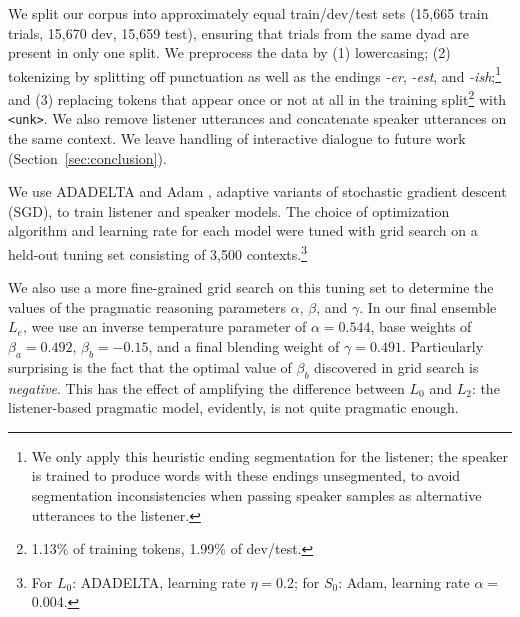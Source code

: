 \documentclass[11pt,letterpaper]{article}
\newcommand{\word}{\textit}
\newcommand{\Listener}{L}
\newcommand{\Speaker}{S}
\renewcommand{\|}{\mid}
\newcommand{\secref}[1]{Section~\ref{#1}}
\newcommand{\todocheck}[1]{\textcolor{red}{#1}}
\begin{document}
We split our corpus into approximately equal train/dev/test sets
(15,665 train trials, 15,670 dev, 15,659 test), ensuring that trials from
the same dyad are present in only one split. 
We preprocess the data by (1) lowercasing; (2) tokenizing
by splitting off punctuation as well as the endings \word{\mbox{-er}}, \word{\mbox{-est}}, and
\word{\mbox{-ish}};\footnote{We
only apply this heuristic ending segmentation for the listener; the speaker is trained to produce
words with these endings unsegmented, to avoid segmentation inconsistencies
when passing speaker samples as alternative utterances to the listener.} and
(3) replacing tokens that appear once or not at all
in the training split\footnote{1.13\% of training tokens, 1.99\% of dev/test.} with \texttt{<unk>}. We also remove
listener utterances and concatenate speaker utterances on the same context. 
We leave handling of interactive dialogue to future work (\secref{sec:conclusion}).

We use ADADELTA
\cite{Zeiler2012} and Adam \cite{Kingma2014}, adaptive variants of
stochastic gradient descent (SGD), to train listener and speaker models.
The choice of optimization
algorithm and learning rate for each model were tuned with grid search
on a held-out tuning set consisting of 3,500 contexts.\footnote{For
  $\Listener_0$: ADADELTA, learning rate $\eta = {}$0.2; for
  $\Speaker_0$: Adam, learning rate $\alpha = {}$0.004.}

We also use a more fine-grained grid search on this tuning set to determine the
values of the pragmatic reasoning parameters $\alpha$, $\beta$, and $\gamma$.
In our final ensemble $\Listener_e$, wee use an inverse temperature parameter of
$\alpha = 0.544$, base weights of $\beta_a = 0.492$, $\beta_b = -0.15$, and
a final blending weight of $\gamma = 0.491$.
Particularly surprising is the fact that the optimal value of $\beta_b$
discovered in grid search is \emph{negative}. This has the effect of amplifying
the difference between $\Listener_0$ and $\Listener_2$: the listener-based
pragmatic model, evidently, is not quite pragmatic enough.
\end{document}

